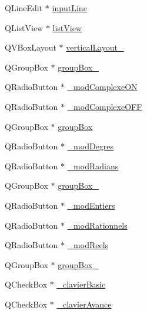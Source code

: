 \begin{DoxyCompactItemize}
\item 
\-Q\-Line\-Edit $\ast$ \hyperlink{class_ui___main_window_ade144a88c11ba1e7ef5e5e33036eea35}{input\-Line}
\item 
\-Q\-List\-View $\ast$ \hyperlink{class_ui___main_window_aaf97aba343edd00a0114b406c2b77365}{list\-View}
\item 
\-Q\-V\-Box\-Layout $\ast$ \hyperlink{class_ui___main_window_a0c01bad60d9f422a1258e710635a2f65}{vertical\-Layout\-\_}
\item 
\-Q\-Group\-Box $\ast$ \hyperlink{class_ui___main_window_ad8a919e5634add9c41bfc319cb9fd338}{group\-Box\-\_}
\item 
\-Q\-Radio\-Button $\ast$ \hyperlink{class_ui___main_window_a905fbcb76b7a5accc476b5c1c9391ea5}{\-\_\-mod\-Complexe\-O\-N}
\item 
\-Q\-Radio\-Button $\ast$ \hyperlink{class_ui___main_window_a1da65de8d4c3c8d5bbf78b0e7796cacf}{\-\_\-mod\-Complexe\-O\-F\-F}
\item 
\-Q\-Group\-Box $\ast$ \hyperlink{class_ui___main_window_aef7cb3be8cecfc9aaf98f036a98781ce}{group\-Box}
\item 
\-Q\-Radio\-Button $\ast$ \hyperlink{class_ui___main_window_a8d6879ed9b5c3d2cf3b9adda602ff3f2}{\-\_\-mod\-Degres}
\item 
\-Q\-Radio\-Button $\ast$ \hyperlink{class_ui___main_window_a55f174647d09c0bd1a532524444d79ee}{\-\_\-mod\-Radians}
\item 
\-Q\-Group\-Box $\ast$ \hyperlink{class_ui___main_window_abb28acde35ffce4d0e6152579df2cbc3}{group\-Box\-\_}
\item 
\-Q\-Radio\-Button $\ast$ \hyperlink{class_ui___main_window_a86335a0c2e9f36f7c9b8cd195b25a1c0}{\-\_\-mod\-Entiers}
\item 
\-Q\-Radio\-Button $\ast$ \hyperlink{class_ui___main_window_a533df173469e3e35768e358b00758ae4}{\-\_\-mod\-Rationnels}
\item 
\-Q\-Radio\-Button $\ast$ \hyperlink{class_ui___main_window_a4b3a8bd75eb6ad2a9be60867badc9a41}{\-\_\-mod\-Reels}
\item 
\-Q\-Group\-Box $\ast$ \hyperlink{class_ui___main_window_a320d3d7ba1cb8fff7b7b95923ed10f5e}{group\-Box\-\_}
\item 
\-Q\-Check\-Box $\ast$ \hyperlink{class_ui___main_window_aface0fc9ed198a25292a75ce279e02c8}{\-\_\-clavier\-Basic}
\item 
\-Q\-Check\-Box $\ast$ \hyperlink{class_ui___main_window_a322846c1c07376202f7e18ce4b80e81a}{\-\_\-clavier\-Avance}
\item 

\end{DoxyCompactItemize}
